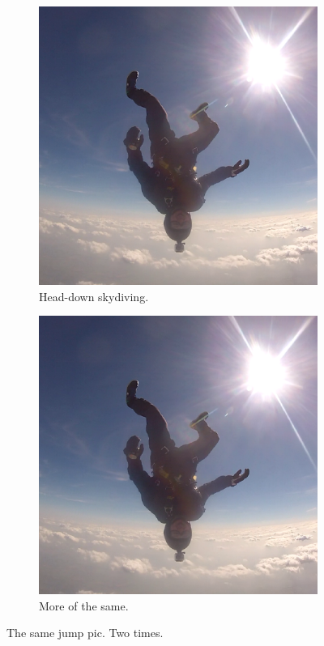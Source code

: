 \documentclass{article}
\begin{document}
\begin{figure}[h!]
  \centering
  \begin{subfigure}[b]{0.4\linewidth}
    \includegraphics[width=\linewidth]{head-down.png}
    \caption{Head-down skydiving.}
  \end{subfigure}
  \begin{subfigure}[b]{0.4\linewidth}
    \includegraphics[width=\linewidth]{head-down.png}
    \caption{More of the same.}
  \end{subfigure}
  \caption{The same jump pic. Two times.}
  \label{fig:coffee}
\end{figure}
\end{document}
